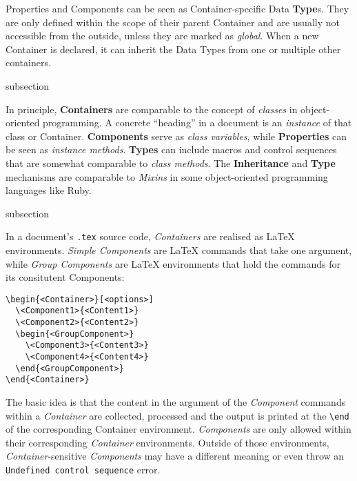 Properties and Components can be seen as Container‐specific Data
\textbf{Type}s. They are only defined within the scope of their parent
Container and are usually not accessible from the outside, unless they
are marked as \textit{global}. When a new Container is declared, it
can inherit the Data Types from one or multiple other containers.

\begin{heading}[label=sec:oop]{subsection}
\end{heading}


In principle, \textbf{Containers} are comparable to the concept of
\textit{classes} in object-oriented programming. A concrete “heading”
in a document is an \textit{instance} of that class or
Container. \textbf{Components} serve as \textit{class variables},
while \textbf{Properties} can be seen as \textit{instance
  methods}. \textbf{Types} can include macros and control sequences
that are somewhat comparable to \textit{class methods}. The
\textbf{Inheritance} and \textbf{Type} mechanisms are comparable to
\textit{Mixins} in some object-oriented programming languages like
Ruby.

\begin{heading}{subsection}
\end{heading}

In a document's \lstinline{.tex} source code, \textit{Containers} are
realised as {\LaTeX} environments. \textit{Simple Components} are
{\LaTeX} commands that take one argument, while \textit{Group
  Components} are {\LaTeX} environments that hold the commands for its
consitutent Components:
\begin{lstlisting}[style=tex]
\begin{<Container>}[<options>]
  \<Component1>{<Content1>}
  \<Component2>{<Content2>}
  \begin{<GroupComponent>}
    \<Component3>{<Content3>}
    \<Component4>{<Content4>}
  \end{<GroupComponent>}
\end{<Container>}
\end{lstlisting}

The basic idea is that the content in the argument of the
\textit{Component} commands within a \textit{Container} are collected,
processed and the output is printed at the \lstinline{\end} of the
corresponding Container environment.  \textit{Components} are only
allowed within their corresponding \textit{Container}
environments. Outside of those environments,
\textit{Container}-sensitive \textit{Components} may have a different
meaning or even throw an \texttt{Undefined control sequence} error.

